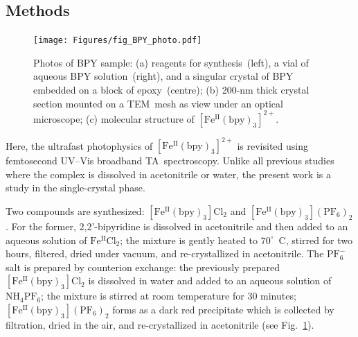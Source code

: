 




\subsection{Methods}

\begin{figure}[ht!]
  \centering
  \texttt{[image: Figures/fig\_BPY\_photo.pdf]}
  \caption[Photos of BPY sample.]{
    Photos of BPY sample:
    (a) reagents for synthesis~(left),
    a vial of aqueous BPY solution~(right),
    and a singular crystal of BPY embedded on a block of epoxy~(centre);
    (b) 200-nm thick crystal section mounted on a TEM~mesh
    as view under an optical microscope;
    (c) molecular structure of $\mathrm{[Fe^{II}(bpy)_3]^{2+}}$.
  }
  \label{fig: BPY-photo}
\end{figure}

Here, the ultrafast photophysics of $\mathrm{[Fe^{II}(bpy)_3]^{2+}}$
is revisited using femtosecond UV--Vis broadband TA~spectroscopy.
Unlike all previous studies where the complex is dissolved in acetonitrile or water,
the present work is a study in the single-crystal phase.

Two compounds are synthesized: $\mathrm{[Fe^{II}(bpy)_3]Cl_2}$ and
$\mathrm{[Fe^{II}(bpy)_3](PF_6)_2}$.
For the former, 2,2'-bipyridine is dissolved in acetonitrile and then added to
an aqueous solution of $\mathrm{Fe^{II} Cl_2}$;
the mixture is gently heated to $70^{\circ}$~C, stirred for two hours,
filtered, dried under vacuum, and re-crystallized in acetonitrile.
The $\mathrm{PF_6^-}$ salt is prepared by counterion exchange:
the previously prepared $\mathrm{[Fe^{II}(bpy)_3]Cl_2}$ is dissolved in water
and added to an aqueous solution of $\mathrm{NH_4PF_6}$;
the mixture is stirred at room temperature for 30 minutes;
$\mathrm{[Fe^{II}(bpy)_3](PF_6)_2}$ forms as a dark red precipitate which is
collected by filtration, dried in the air, and re-crystallized in acetonitrile
(see Fig.~\ref{fig: BPY-photo}).

